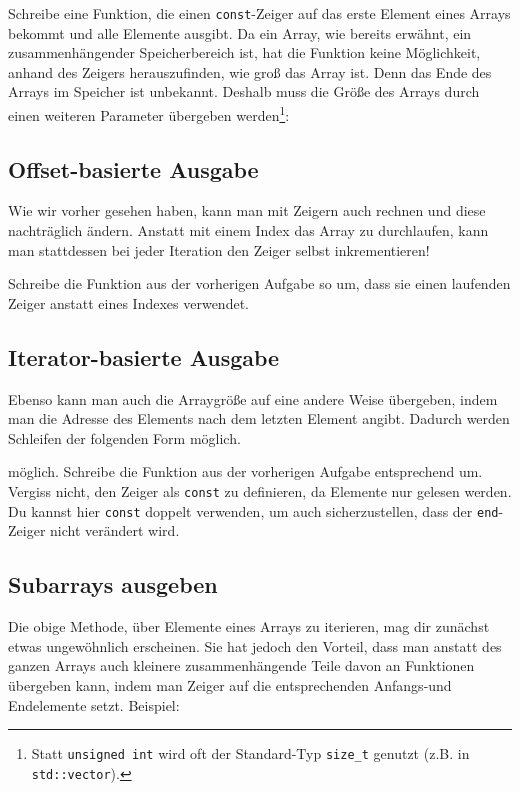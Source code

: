 Schreibe eine Funktion, die einen \lstinline{const}-Zeiger auf das erste Element eines Arrays bekommt und alle Elemente ausgibt.
Da ein Array, wie bereits erwähnt, ein zusammenhängender Speicherbereich ist, hat die Funktion keine Möglichkeit, anhand des Zeigers herauszufinden, wie groß das Array ist. Denn das Ende des Arrays im Speicher ist unbekannt. Deshalb muss die Größe des Arrays durch einen weiteren Parameter übergeben werden\footnote{Statt \lstinline{unsigned int} wird oft der Standard-Typ \lstinline{size_t} genutzt (z.B. in \lstinline{std::vector}).}:



\subsection{Offset-basierte Ausgabe}
Wie wir vorher gesehen haben, kann man mit Zeigern auch rechnen und diese nachträglich ändern.
Anstatt mit einem Index das Array zu durchlaufen, kann man stattdessen bei jeder Iteration den Zeiger selbst inkrementieren!



Schreibe die Funktion aus der vorherigen Aufgabe so um, dass sie einen laufenden Zeiger anstatt eines Indexes verwendet.

\subsection{Iterator-basierte Ausgabe}
Ebenso kann man auch die Arraygröße auf eine andere Weise übergeben, indem man die Adresse des Elements nach dem letzten Element angibt.
Dadurch werden Schleifen der folgenden Form möglich.



möglich.
Schreibe die Funktion aus der vorherigen Aufgabe entsprechend um.
Vergiss nicht, den Zeiger als \lstinline{const} zu definieren, da Elemente nur gelesen werden.
Du kannst hier \lstinline{const} doppelt verwenden, um auch sicherzustellen, dass der \lstinline{end}-Zeiger nicht verändert wird.

\subsection{Subarrays ausgeben}
Die obige Methode, über Elemente eines Arrays zu iterieren, mag dir zunächst etwas ungewöhnlich erscheinen.
Sie hat jedoch den Vorteil, dass man anstatt des ganzen Arrays auch kleinere zusammenhängende Teile davon an Funktionen übergeben kann, indem man Zeiger auf die entsprechenden Anfangs-und Endelemente setzt.
Beispiel:

